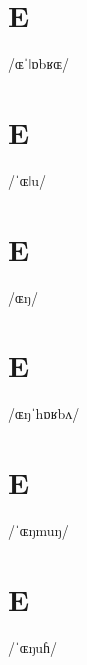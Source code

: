 \documentclass[10pt,a4paper,twoside]{book}
\begin{document}
\section*{E}

\begin{multicols}{3}
 {/ɶˈǀɒbʁɶ/} {}
\end{multicols}

\section*{E}

\begin{multicols}{3}
 {/ˈɶǀu/} {}
\end{multicols}

\section*{E}

\begin{multicols}{3}
 {/ɶŋ/} {}
\end{multicols}

\section*{E}

\begin{multicols}{3}
 {/ɶŋˈhɒʁbʌ/} {}
\end{multicols}

\section*{E}

\begin{multicols}{3}
 {/ˈɶŋmuŋ/} {}
\end{multicols}

\section*{E}

\begin{multicols}{3}
 {/ˈɶŋuɦ/} {}
\end{multicols}
\end{document}
